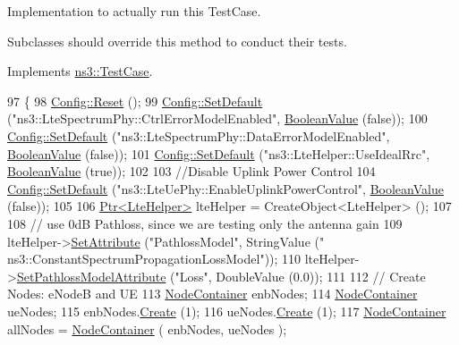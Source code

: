 Implementation to actually run this Test\+Case. 

Subclasses should override this method to conduct their tests. 

Implements \hyperlink{classns3_1_1TestCase_a8ff74680cf017ed42011e4be51917a24}{ns3\+::\+Test\+Case}.


\begin{DoxyCode}
97 \{
98   \hyperlink{group__config_ga2c1b65724f42f8c72276d7e7ad6df6db}{Config::Reset} ();
99   \hyperlink{group__config_ga2e7882df849d8ba4aaad31c934c40c06}{Config::SetDefault} (\textcolor{stringliteral}{"ns3::LteSpectrumPhy::CtrlErrorModelEnabled"}, 
      \hyperlink{classns3_1_1BooleanValue}{BooleanValue} (\textcolor{keyword}{false}));
100   \hyperlink{group__config_ga2e7882df849d8ba4aaad31c934c40c06}{Config::SetDefault} (\textcolor{stringliteral}{"ns3::LteSpectrumPhy::DataErrorModelEnabled"}, 
      \hyperlink{classns3_1_1BooleanValue}{BooleanValue} (\textcolor{keyword}{false}));
101   \hyperlink{group__config_ga2e7882df849d8ba4aaad31c934c40c06}{Config::SetDefault} (\textcolor{stringliteral}{"ns3::LteHelper::UseIdealRrc"}, 
      \hyperlink{classns3_1_1BooleanValue}{BooleanValue} (\textcolor{keyword}{true}));
102 
103   \textcolor{comment}{//Disable Uplink Power Control}
104   \hyperlink{group__config_ga2e7882df849d8ba4aaad31c934c40c06}{Config::SetDefault} (\textcolor{stringliteral}{"ns3::LteUePhy::EnableUplinkPowerControl"}, 
      \hyperlink{classns3_1_1BooleanValue}{BooleanValue} (\textcolor{keyword}{false}));
105 
106   \hyperlink{classns3_1_1Ptr}{Ptr<LteHelper>} lteHelper = CreateObject<LteHelper> ();
107 
108   \textcolor{comment}{// use 0dB Pathloss, since we are testing only the antenna gain}
109   lteHelper->\hyperlink{classns3_1_1ObjectBase_ac60245d3ea4123bbc9b1d391f1f6592f}{SetAttribute} (\textcolor{stringliteral}{"PathlossModel"}, StringValue (\textcolor{stringliteral}{"
      ns3::ConstantSpectrumPropagationLossModel"}));
110   lteHelper->\hyperlink{classns3_1_1LteHelper_aa96ebbd6845ca61c2b5e08e84481a348}{SetPathlossModelAttribute} (\textcolor{stringliteral}{"Loss"}, DoubleValue (0.0));
111 
112   \textcolor{comment}{// Create Nodes: eNodeB and UE}
113   \hyperlink{classns3_1_1NodeContainer}{NodeContainer} enbNodes;
114   \hyperlink{classns3_1_1NodeContainer}{NodeContainer} ueNodes;
115   enbNodes.\hyperlink{classns3_1_1NodeContainer_a787f059e2813e8b951cc6914d11dfe69}{Create} (1);
116   ueNodes.\hyperlink{classns3_1_1NodeContainer_a787f059e2813e8b951cc6914d11dfe69}{Create} (1);
117   \hyperlink{classns3_1_1NodeContainer}{NodeContainer} allNodes = \hyperlink{classns3_1_1NodeContainer}{NodeContainer} ( enbNodes, ueNodes );

\end{DoxyCode}
